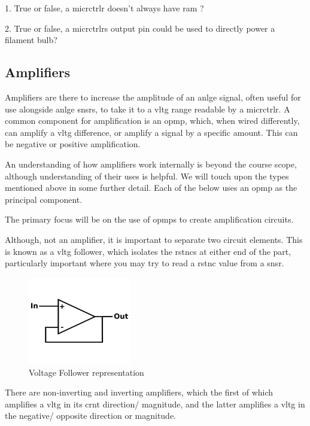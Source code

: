 \documentclass[a4paper,11pt]{report}
\newcommand{\Quiz}[1] %
{
\par\noindent %
\phantomsection %
\todo[inline, color=blue!30]{\textbf{#1}} %
\vspace{1em} %
}
\begin{document}
\Quiz{Quiz}

1. True or false, a \gls{micrctrlr} doesn't always have \gls{ram} ?

2. True or false, a \gls{micrctrlr}s output pin could be used to directly power a filament bulb?

\vspace*{1\baselineskip}

\subsection{Amplifiers}

Amplifiers are there to increase the amplitude of an \gls{anlge} signal, often useful for use alongside \gls{anlge} \gls{snsr}s, to take it to a \gls{vltg} range readable by a \gls{micrctrlr}. A common component for amplification is an \gls{opmp}, which, when wired differently, can amplify a \gls{vltg} difference, or amplify a signal by a specific amount. This can be negative or positive amplification.

An understanding of how amplifiers work internally is beyond the course scope, although understanding of their uses is helpful. We will touch upon the types mentioned above in some further detail. Each of the below uses an \gls{opmp} as the principal component.

The primary focus will be on the use of \gls{opmp}s to create amplification circuits.

Although, not an amplifier, it is important to separate two circuit elements. This is known as a \gls{vltg} follower, which isolates the \gls{rstnc}s at either end of the part, particularly important where you may try to read a \gls{rstnc} value from a \gls{snsr}.

\begin{figure}[H]
\centering
\includegraphics[width=0.4\textwidth]{voltagefollower}
\caption{Voltage Follower representation}
\end{figure}

There are non-inverting and inverting amplifiers, which the first of which amplifies a \gls{vltg} in its \gls{crnt} direction/ magnitude, and the latter amplifies a \gls{vltg} in the negative/ opposite direction or magnitude.
\end{document}
